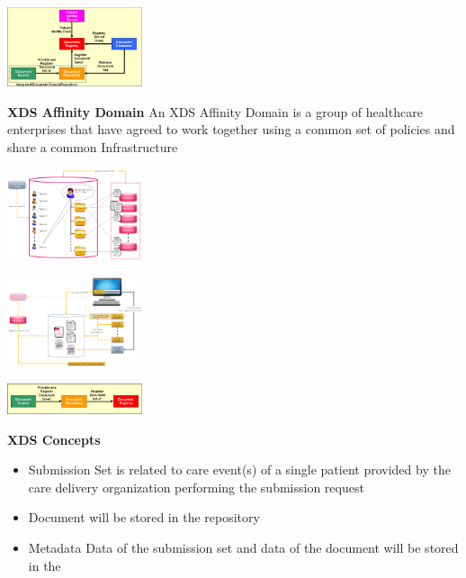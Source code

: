 \documentclass{report}
\newenvironment{Figure}
	{\par\medskip\noindent\minipage{\linewidth}}
	{\endminipage\par\medskip}
\theoremstyle{definition}
\theoremstyle{example}
\begin{document}
\begin{Figure}
   \centering
    \includegraphics[width=150px]{img/XDSb.png}
        \label{fig:Workflow from XDS.b}
\end{Figure}

\textbf{XDS Affinity Domain}
An XDS Affinity Domain is a group of healthcare enterprises that have agreed to work together using a common set of policies and share a common Infrastructure

\begin{Figure}
   \centering
    \includegraphics[width=150px]{img/DocumentRegistry.png}
        \label{fig:Workflow to register a document}
\end{Figure}

\begin{Figure}
   \centering
    \includegraphics[width=150px]{img/DocumentRepo.png}
        \label{fig:Workflow for a document-repository}
\end{Figure}

\begin{Figure}
   \centering
    \includegraphics[width=150px]{img/ITI41.png}
        \label{fig:Workflow from ITI-41}
\end{Figure}

\textbf{XDS Concepts}
\begin{itemize}
   \item Submission Set
   \subitem is related to care event(s) of a single patient provided by the care delivery organization performing the submission request 
   \item Document
   \subitem will be stored in the repository 
   \item Metadata
   \subitem Data of the submission set and data of the document will be stored in the 
\end{itemize}
\end{document}
